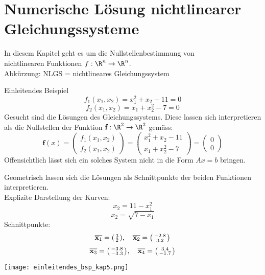 \section{Numerische Lösung nichtlinearer Gleichungssysteme}

\begin{remark}
    In diesem Kapitel geht es um die Nullstellenbestimmung von\\ nichtlinearen Funktionen $f: \R^n \to \R^n$. \\
    Abkürzung: NLGS = nichtlineares Gleichungssystem
\end{remark}

\begin{example2}{Einleitendes Beispiel}
    $$f_1(x_1, x_2) = x_1^2 + x_2 - 11 = 0$$
    $$f_2(x_1, x_2) = x_1 + x_2^2 - 7 = 0$$
    Gesucht sind die Lösungen des Gleichungssystems. Diese lassen sich interpretieren als die Nullstellen der Funktion $\textbf{f}: \R^2 \to \R^2$ gemäss:
    $$\textbf{f}(x) = \begin{pmatrix} f_1 (x_1, x_2) \\ f_2 (x_1, x_2) \end{pmatrix} = \begin{pmatrix} x_1^2 + x_2 - 11 \\ x_1 + x_2^2 - 7 \end{pmatrix} = \begin{pmatrix} 0\\ 0 \end{pmatrix}$$
    Offensichtlich lässt sich ein solches System nicht in die Form $Ax = b$ bringen. 

    \begin{minipage}{0.5\linewidth}
    Geometrisch lassen sich die Lösungen als Schnittpunkte der beiden Funktionen interpretieren.\\
    Explizite Darstellung der Kurven:
    $$x_2 = 11 - x_1^2$$
    $$x_2 = \sqrt{7 - x_1}$$
    Schnittpunkte:
    $$\overline{\textbf{x}_1} = \begin{psmallmatrix} 3 \\ 2 \end{psmallmatrix}, \quad \overline{\textbf{x}_2} = \begin{psmallmatrix} -2.8 \\ 3.2 \end{psmallmatrix}$$
    $$\overline{\textbf{x}_3} = \begin{psmallmatrix} -3.8 \\ -3.3 \end{psmallmatrix}, \quad \overline{\textbf{x}_4} = \begin{psmallmatrix} 3.4 \\ -1.7 \end{psmallmatrix}$$
    \end{minipage}
    \begin{minipage}{0.5\linewidth}
    \texttt{[image: einleitendes\_bsp\_kap5.png]}
    \end{minipage}
\end{example2}

